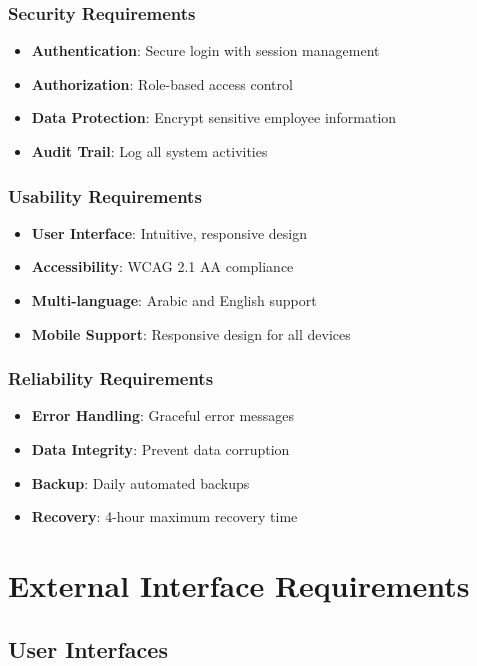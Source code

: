 \documentclass[12pt,a4paper]{article}
\begin{document}
\subsubsection{Security Requirements}
\begin{itemize}
    \item \textbf{Authentication}: Secure login with session management
    \item \textbf{Authorization}: Role-based access control
    \item \textbf{Data Protection}: Encrypt sensitive employee information
    \item \textbf{Audit Trail}: Log all system activities
\end{itemize}

\subsubsection{Usability Requirements}
\begin{itemize}
    \item \textbf{User Interface}: Intuitive, responsive design
    \item \textbf{Accessibility}: WCAG 2.1 AA compliance
    \item \textbf{Multi-language}: Arabic and English support
    \item \textbf{Mobile Support}: Responsive design for all devices
\end{itemize}

\subsubsection{Reliability Requirements}
\begin{itemize}
    \item \textbf{Error Handling}: Graceful error messages
    \item \textbf{Data Integrity}: Prevent data corruption
    \item \textbf{Backup}: Daily automated backups
    \item \textbf{Recovery}: 4-hour maximum recovery time
\end{itemize}

\section{External Interface Requirements}

\subsection{User Interfaces}
\end{document}
